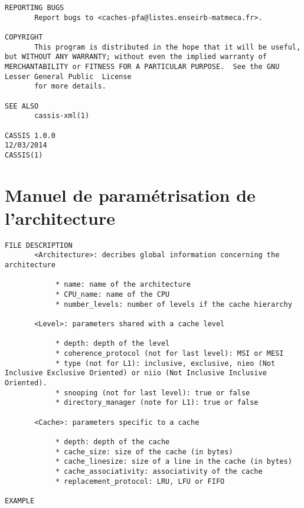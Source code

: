 \begin{lstlisting}[style=styleMan]
REPORTING BUGS
       Report bugs to <caches-pfa@listes.enseirb-matmeca.fr>.

COPYRIGHT
       This program is distributed in the hope that it will be useful, but WITHOUT ANY WARRANTY; without even the implied warranty of MERCHANTABILITY or FITNESS FOR A PARTICULAR PURPOSE.  See the GNU Lesser General Public  License
       for more details.

SEE ALSO
       cassis-xml(1)

CASSIS 1.0.0                                                                                                  12/03/2014                                                                                                     CASSIS(1)
\end{lstlisting}
\newpage
\section{Manuel de paramétrisation de l'architecture}
\label{manarchi}
\begin{lstlisting}[style=styleMan]
FILE DESCRIPTION
       <Architecture>: decribes global information concerning the architecture

            * name: name of the architecture
            * CPU_name: name of the CPU
            * number_levels: number of levels if the cache hierarchy

       <Level>: parameters shared with a cache level

            * depth: depth of the level
            * coherence_protocol (not for last level): MSI or MESI
            * type (not for L1): inclusive, exclusive, nieo (Not Inclusive Exclusive Oriented) or niio (Not Inclusive Inclusive Oriented).
            * snooping (not for last level): true or false
            * directory_manager (note for L1): true or false

       <Cache>: parameters specific to a cache

            * depth: depth of the cache
            * cache_size: size of the cache (in bytes)
            * cache_linesize: size of a line in the cache (in bytes)
            * cache_associativity: associativity of the cache
            * replacement_protocol: LRU, LFU or FIFO

EXAMPLE
\end{lstlisting}
